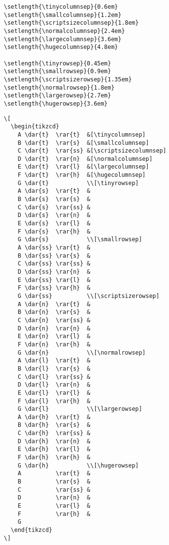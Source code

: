 \documentclass{article}
\begin{document}
\begin{verbatim}
\setlength{\tinycolumnsep}{0.6em}
\setlength{\smallcolumnsep}{1.2em}
\setlength{\scriptsizecolumnsep}{1.8em}
\setlength{\normalcolumnsep}{2.4em}
\setlength{\largecolumnsep}{3.6em}
\setlength{\hugecolumnsep}{4.8em}

\setlength{\tinyrowsep}{0.45em}
\setlength{\smallrowsep}{0.9em}
\setlength{\scriptsizerowsep}{1.35em}
\setlength{\normalrowsep}{1.8em}
\setlength{\largerowsep}{2.7em}
\setlength{\hugerowsep}{3.6em}
\end{verbatim}

\begin{verbatim}
\[
  \begin{tikzcd}
    A \dar{t}  \rar{t}  &[\tinycolumnsep]
    B \dar{t}  \rar{s}  &[\smallcolumnsep]
    C \dar{t}  \rar{ss} &[\scriptsizecolumnsep]
    D \dar{t}  \rar{n}  &[\normalcolumnsep]
    E \dar{t}  \rar{l}  &[\largecolumnsep]
    F \dar{t}  \rar{h}  &[\hugecolumnsep]
    G \dar{t}           \\[\tinyrowsep]
    A \dar{s}  \rar{t}  &
    B \dar{s}  \rar{s}  &
    C \dar{s}  \rar{ss} &
    D \dar{s}  \rar{n}  &
    E \dar{s}  \rar{l}  &
    F \dar{s}  \rar{h}  &
    G \dar{s}           \\[\smallrowsep]
    A \dar{ss} \rar{t}  &
    B \dar{ss} \rar{s}  &
    C \dar{ss} \rar{ss} &
    D \dar{ss} \rar{n}  &
    E \dar{ss} \rar{l}  &
    F \dar{ss} \rar{h}  &
    G \dar{ss}          \\[\scriptsizerowsep]
    A \dar{n}  \rar{t}  &
    B \dar{n}  \rar{s}  &
    C \dar{n}  \rar{ss} &
    D \dar{n}  \rar{n}  &
    E \dar{n}  \rar{l}  &
    F \dar{n}  \rar{h}  &
    G \dar{n}           \\[\normalrowsep]
    A \dar{l}  \rar{t}  &
    B \dar{l}  \rar{s}  &
    C \dar{l}  \rar{ss} &
    D \dar{l}  \rar{n}  &
    E \dar{l}  \rar{l}  &
    F \dar{l}  \rar{h}  &
    G \dar{l}           \\[\largerowsep]
    A \dar{h}  \rar{t}  &
    B \dar{h}  \rar{s}  &
    C \dar{h}  \rar{ss} &
    D \dar{h}  \rar{n}  &
    E \dar{h}  \rar{l}  &
    F \dar{h}  \rar{h}  &
    G \dar{h}           \\[\hugerowsep]
    A          \rar{t}  &
    B          \rar{s}  &
    C          \rar{ss} &
    D          \rar{n}  &
    E          \rar{l}  &
    F          \rar{h}  &
    G
  \end{tikzcd}
\]
\end{verbatim}
%
\end{document}
